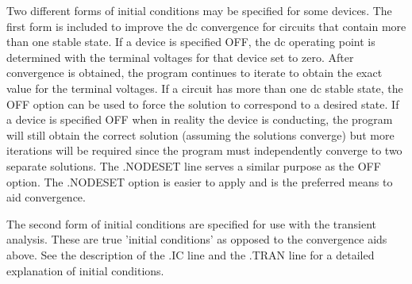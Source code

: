 Two different forms of initial conditions may be specified  for
some  devices.   The  first  form  is included to
improve the dc convergence for circuits  that  contain  more
than one stable state.  If a device is specified OFF, the dc
operating point is determined with the terminal voltages for
that device set to zero.  After convergence is obtained, the
program continues to iterate to obtain the exact  value  for
the  terminal  voltages.   If a circuit has more than one dc
stable state, the OFF option can be used to force the  solution
to  correspond  to  a  desired  state.  If a device is
specified OFF when in reality the device is conducting,  the
program will still obtain the correct solution (assuming the
solutions converge) but more  iterations  will  be  required
since   the  program  must  independently  converge  to  two
separate solutions.  The .NODESET line serves a similar purpose
as  the  OFF option.  The .NODESET option is easier to
apply and is the preferred means to aid convergence.

The second form of initial conditions are specified for
use  with  the  transient analysis.  These are true 'initial
conditions' as opposed to the convergence aids  above.   See
the  description  of  the  .IC line and the .TRAN line for a
detailed explanation of initial conditions.


